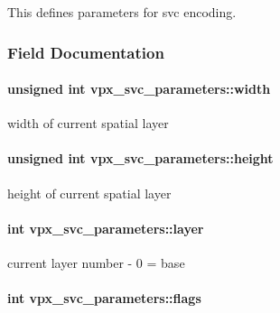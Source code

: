 \-This defines parameters for svc encoding. 

\subsubsection{\-Field \-Documentation}
\hypertarget{structvpx__svc__parameters_aaf9780718072da62f92440cb2b7343b9}{
\paragraph[{width}]{\setlength{\rightskip}{0pt plus 5cm}unsigned int {\bf vpx\-\_\-svc\-\_\-parameters\-::width}}}\label{structvpx__svc__parameters_aaf9780718072da62f92440cb2b7343b9}
width of current spatial layer \hypertarget{structvpx__svc__parameters_ac7af8c9f54e7b2a96b0c30a1004bd45b}{
\paragraph[{height}]{\setlength{\rightskip}{0pt plus 5cm}unsigned int {\bf vpx\-\_\-svc\-\_\-parameters\-::height}}}\label{structvpx__svc__parameters_ac7af8c9f54e7b2a96b0c30a1004bd45b}
height of current spatial layer \hypertarget{structvpx__svc__parameters_a5f4d45ab6144eb13a3f27809651b40ef}{
\paragraph[{layer}]{\setlength{\rightskip}{0pt plus 5cm}int {\bf vpx\-\_\-svc\-\_\-parameters\-::layer}}}\label{structvpx__svc__parameters_a5f4d45ab6144eb13a3f27809651b40ef}
current layer number -\/ 0 = base \hypertarget{structvpx__svc__parameters_a9324b3015839560c5e2bfd1dd550b9aa}{
\paragraph[{flags}]{\setlength{\rightskip}{0pt plus 5cm}int {\bf vpx\-\_\-svc\-\_\-parameters\-::flags}}}\label{structvpx__svc__parameters_a9324b3015839560c5e2bfd1dd550b9aa}
